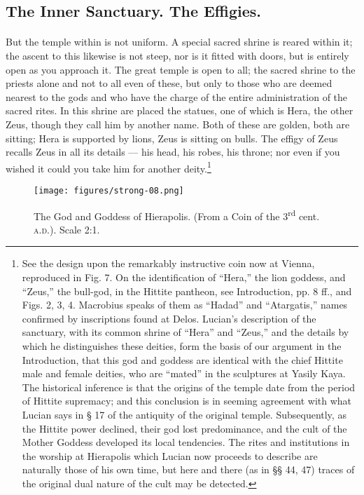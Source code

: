 \documentclass[a4paper, 11pt, oneside, polutonikogreek, english]{article}
\begin{document}
\subsection{The Inner Sanctuary. The Effigies.}
\paragraph{}
But the temple within is not uniform. A special sacred shrine is reared within it; the ascent to this likewise is not steep, nor is it fitted with doors, but is entirely open as you approach it. The great temple is open to all; the sacred shrine to the priests alone and not to all even of these, but only to those who are deemed nearest to the gods and who have the charge of the entire administration of the sacred rites. In this shrine are placed the statues, one of which is Hera, the other Zeus, though they call him by another name. Both of these are golden, both are sitting; Hera is supported by lions, Zeus is sitting on bulls. The effigy of Zeus recalls Zeus in all its details --- his head, his robes, his throne; nor even if you wished it could you take him for another deity.\footnote{See the design upon the remarkably instructive coin now at Vienna, reproduced in Fig. 7. On the identification of ``Hera,'' the lion goddess, and ``Zeus,'' the bull-god, in the Hittite pantheon, see Introduction, pp. 8 ff., and Figs. 2, 3, 4. Macrobius speaks of them as ``Hadad'' and ``Atargatis,'' names confirmed by inscriptions found at Delos. Lucian's description of the sanctuary, with its common shrine of ``Hera'' and ``Zeus,'' and the details by which he distinguishes these deities, form the basis of our argument in the Introduction, that this god and goddess are identical with the chief Hittite male and female deities, who are ``mated'' in the sculptures at Yasily Kaya. The historical inference is that the origins of the temple date from the period of Hittite supremacy; and this conclusion is in seeming agreement with what Lucian says in § 17 of the antiquity of the original temple. Subsequently, as the Hittite power declined, their god lost predominance, and the cult of the Mother Goddess developed its local tendencies. The rites and institutions in the worship at Hierapolis which Lucian now proceeds to describe are naturally those of his own time, but here and there (as in §§ 44, 47) traces of the original dual nature of the cult may be detected.}

\begin{figure}[H]
\centering
\texttt{[image: figures/strong-08.png]}
\caption{The God and Goddess of Hierapolis. (From a Coin of the 3\textsuperscript{rd} cent. \textsc{a.d.}). Scale 2:1.}
\end{figure}
\end{document}
